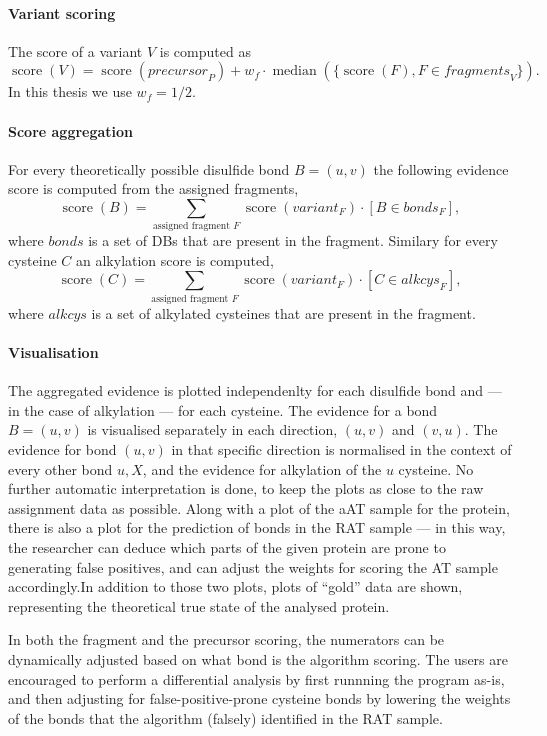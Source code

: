 \paragraph{Variant scoring} The score of a variant \(V\) is computed as \[\operatorname{score}(V) = \operatorname{score}(\mathit{precursor}_P) + w_f \cdot \operatorname{median}(\{ \operatorname{score}(F), F \in \mathit{fragments}_V \}).\] In this thesis we use \(w_f = 1/2\).

\paragraph{Score aggregation} For every theoretically possible disulfide bond \(B = (u, v)\) the following evidence score is computed  from the assigned fragments, \[\operatorname{score}(B) = \sum_{\text{assigned fragment } F} \operatorname{score}(\mathit{variant}_F) \cdot [B \in \mathit{bonds}_F], \] where \(\mathit{bonds}\) is a set of DBs that are present in the fragment. Similary for every cysteine \(C\) an alkylation score is computed, \[\operatorname{score}(C) = \sum_{\text{assigned fragment } F} \operatorname{score}(\mathit{variant}_F) \cdot [C \in \mathit{alkcys}_F],\] where \(\mathit{alkcys}\) is a set of alkylated cysteines that are present in the fragment.


\paragraph{Visualisation} The aggregated evidence is plotted independenlty for each disulfide bond and --- in the case of alkylation --- for each cysteine. The evidence for a bond \(B = (u, v)\) is visualised separately in each direction, \((u, v)\) and \((v, u)\). The evidence for bond \((u, v)\) in that specific direction is normalised in the context of every other bond \(u, X\), and the evidence for alkylation of the \(u\) cysteine. No further automatic interpretation is done, to keep the plots as close to the raw assignment data as possible. Along with a plot of the aAT sample for the protein, there is also a plot for the prediction of bonds in the RAT sample --- in this way, the researcher can deduce which parts of the given protein are prone to generating false positives, and can adjust the weights for scoring the AT sample accordingly.In addition to those two plots, plots of ``gold'' data are shown, representing the theoretical true state of the analysed protein.

In both the fragment and the precursor scoring, the numerators can be dynamically adjusted based on what bond is the algorithm scoring. The users are encouraged to perform a differential analysis by first runnning the program as-is, and then adjusting for false-positive-prone cysteine bonds by lowering the weights of the bonds that the algorithm (falsely) identified in the RAT sample.

